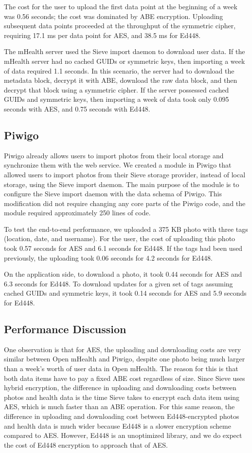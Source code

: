 The cost for the user to upload the first data point
at the beginning of a week was 0.56 seconds;
the cost was dominated by ABE encryption.
Uploading subsequent data points proceeded
at the throughput of the symmetric cipher,
requiring 17.1 ms per data point for AES,
and 38.5 ms for Ed448.

The mHealth server used the Sieve import daemon
to download user data. If the mHealth server
had no cached GUIDs or symmetric keys, then
importing a week of data required 1.1 seconds.
In this scenario, the server had to download
the metadata block, decrypt it with ABE,
download the raw data block, and then decrypt
that block using a symmetric cipher. If the
server possessed cached GUIDs and symmetric keys,
then importing a week of data took only 0.095
seconds with AES, and 0.75 seconds with Ed448.

\subsection{Piwigo}
Piwigo already allows users
to import photos from their local storage and synchronize
them with the web service. We created a module in
Piwigo that allowed users to import photos from
their Sieve storage provider, instead of local storage,
using the Sieve import daemon. The main purpose of the
module is to configure the Sieve import daemon
with the data schema of Piwigo. This modification
did not require changing any core parts of the Piwigo
code, and the module required approximately 250 lines 
of code.

To test the end-to-end performance, we uploaded a 375 KB photo with three
tags (location, date, and username). For the user, the cost of uploading 
this photo took 0.57 seconds for AES and 6.1 seconds for Ed448.
If the tags had been used previously, the uploading
took 0.06 seconds for 4.2 seconds for Ed448.

On the application side, to download a photo, 
it took 0.44 seconds for AES and 
6.3 seconds for Ed448. To download updates for a given
set of tags assuming cached GUIDs and symmetric keys,
it took 0.14 seconds for AES and 5.9 seconds for Ed448.

\subsection{Performance Discussion}
One observation is that for AES, the uploading and downloading 
costs are very similar between
Open mHealth and Piwigo, despite one photo being
much larger than a week's worth of user data in Open mHealth.
The reason for this is that both data items have to pay a fixed
ABE cost regardless of size. Since Sieve uses hybrid encryption,
the difference in uploading and downloading 
costs between photos and health data
is the time Sieve takes to
encrypt each data item using AES, which is much faster than an ABE operation.
For this same reason, the difference in
uploading and downloading cost between Ed448-encrypted photos and health data
is much wider because Ed448 is a slower encryption scheme compared to AES. 
However, Ed448 is an unoptimized library, and we do expect the cost of
Ed448 encryption to approach that of AES.

